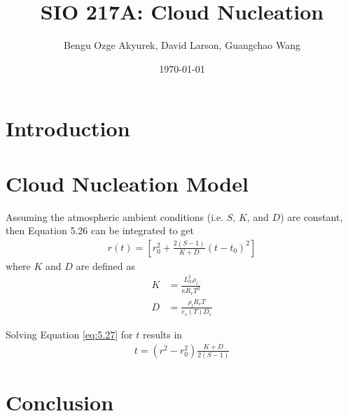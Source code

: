 \documentclass[]{article}
\title{SIO 217A: Cloud Nucleation}
\author{Bengu Ozge Akyurek, David Larson, Guangchao Wang}
\date{\today}
\begin{document}
\maketitle

\section{Introduction}

\section{Cloud Nucleation Model}

Assuming the atmospheric ambient conditions (i.e. $S$, $K$, and $D$) are
constant, then Equation 5.26 can be integrated to get
\begin{align}
    \label{eq:5.27}
    r(t) = \left[ r_0^2 + \frac{2(S -1)}{K + D}(t - t_0)^2 \right]
\end{align}
where $K$ and $D$ are defined as
\begin{align}
    K &= \frac{L_{lv}^2 \rho_l}{\kappa R_v T^2} \\
    D &= \frac{\rho_l R_v T}{e_s(T) D_v}
\end{align}

Solving Equation \ref{eq:5.27} for $t$ results in
\begin{align}
    t = (r^2 - r_0^2) \frac{K + D}{2(S - 1)}
\end{align}

\section{Conclusion}
\end{document}
